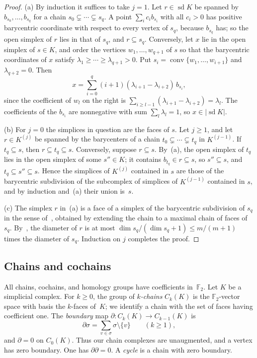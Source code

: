 \documentclass[11pt]{article}
\theoremstyle{definition}
\numberwithin{equation}{section}
\newcommand{\F}{\mathbb F_2}
\DeclareMathOperator{\conv}{conv}
\begin{document}
\begin{proof}
(a) By induction it suffices to take $j=1$. Let $r\in\operatorname{sd}K$ be spanned by $b_{s_0},\ldots,b_{s_q}$ for a chain $s_0\subsetneq\cdots\subsetneq s_q$. A point $\sum_ic_ib_{s_i}$ with all $c_i>0$ has positive barycentric coordinate with respect to every vertex of $s_q$, because $b_{s_q}$ has; so the open simplex of $r$ lies in that of $s_q$, and $r\subseteq s_q$. Conversely, let $x$ lie in the open simplex of $s\in K$, and order the vertices $w_1,\ldots,w_{q+1}$ of $s$ so that the barycentric coordinates of $x$ satisfy $\lambda_1\ge\cdots\ge\lambda_{q+1}>0$. Put $s_i=\conv\{w_1,\ldots,w_{i+1}\}$ and $\lambda_{q+2}=0$. Then
\begin{equation*}
 x=\sum_{i=0}^q(i+1)(\lambda_{i+1}-\lambda_{i+2})\,b_{s_i},
\end{equation*}
since the coefficient of $w_l$ on the right is $\sum_{i\ge l-1}(\lambda_{i+1}-\lambda_{i+2})=\lambda_l$. The coefficients of the $b_{s_i}$ are nonnegative with sum $\sum_l\lambda_l=1$, so $x\in|\operatorname{sd}K|$.

(b) For $j=0$ the simplices in question are the faces of $s$. Let $j\ge1$, and let $r\in K^{(j)}$ be spanned by the barycenters of a chain $t_0\subsetneq\cdots\subsetneq t_q$ in $K^{(j-1)}$. If $t_q\subseteq s$, then $r\subseteq t_q\subseteq s$. Conversely, suppose $r\subseteq s$. By~(a), the open simplex of $t_q$ lies in the open simplex of some $s''\in K$; it contains $b_{t_q}\in r\subseteq s$, so $s''\subseteq s$, and $t_q\subseteq s''\subseteq s$. Hence the simplices of $K^{(j)}$ contained in $s$ are those of the barycentric subdivision of the subcomplex of simplices of $K^{(j-1)}$ contained in $s$, and by induction and~(a) their union is~$s$.

(c) The simplex $r$ in~(a) is a face of a simplex of the barycentric subdivision of $s_q$ in the sense of~\cite[pp.~119--120]{Hatcher}, obtained by extending the chain to a maximal chain of faces of $s_q$. By~\cite[p.~120]{Hatcher}, the diameter of $r$ is at most $\dim s_q/(\dim s_q+1)\le m/(m+1)$ times the diameter of $s_q$. Induction on $j$ completes the proof.
\end{proof}

\subsection{Chains and cochains}\label{sec:chains}

All chains, cochains, and homology groups have coefficients in~$\F$. Let $K$ be a simplicial complex. For $k\ge0$, the group of \emph{$k$-chains} $C_k(K)$ is the $\F$-vector space with basis the $k$-faces of~$K$; we identify a chain with the set of faces having coefficient one. The \emph{boundary} map $\partial:C_k(K)\to C_{k-1}(K)$ is
\begin{equation*}
 \partial\sigma=\sum_{v\in\sigma}\sigma\setminus\{v\}\qquad(k\ge1),
\end{equation*}
and $\partial=0$ on $C_0(K)$. Thus our chain complexes are unaugmented, and a vertex has zero boundary. One has $\partial\partial=0$. A \emph{cycle} is a chain with zero boundary.
\end{document}
